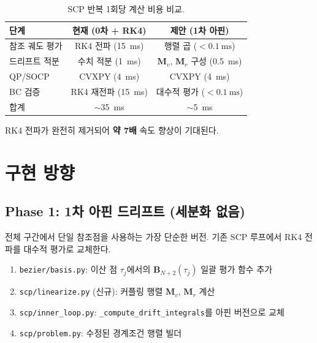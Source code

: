 \documentclass[11pt]{article}
\begin{document}
\begin{table}[h]
\centering
\caption{SCP 반복 1회당 계산 비용 비교.}
\label{tab:cost-compare}
\small
\begin{tabular}{@{}lcc@{}}
\toprule
단계 & 현재 (0차 + RK4) & 제안 (1차 아핀) \\
\midrule
참조 궤도 평가 & RK4 전파 (\SI{15}{\ms}) & 행렬 곱 ($<\SI{0.1}{\ms}$) \\
드리프트 적분   & 수치 적분 (\SI{1}{\ms}) & $\mathbf{M}_v$, $\mathbf{M}_r$ 구성 (\SI{0.5}{\ms}) \\
QP/SOCP        & CVXPY (\SI{4}{\ms})      & CVXPY (\SI{4}{\ms}) \\
BC 검증        & RK4 재전파 (\SI{15}{\ms}) & 대수적 평가 ($<\SI{0.1}{\ms}$) \\
\midrule
합계           & $\sim$\SI{35}{\ms}       & $\sim$\SI{5}{\ms} \\
\bottomrule
\end{tabular}
\end{table}

RK4 전파가 완전히 제거되어 \textbf{약 7배} 속도 향상이 기대된다.

\section{구현 방향}
\label{sec:implementation}

\subsection{Phase 1: 1차 아핀 드리프트 (세분화 없음)}

전체 구간에서 단일 참조점을 사용하는 가장 단순한 버전.
기존 SCP 루프에서 RK4 전파를 대수적 평가로 교체한다.

\begin{enumerate}
  \item \texttt{bezier/basis.py}: 이산 점 $\tau_j$에서의 $\mathbf{B}_{N+2}(\tau_j)$ 일괄 평가 함수 추가
  \item \texttt{scp/linearize.py} (신규): 커플링 행렬 $\mathbf{M}_v$, $\mathbf{M}_r$ 계산
  \item \texttt{scp/inner\_loop.py}: \texttt{\_compute\_drift\_integrals}를 아핀 버전으로 교체
  \item \texttt{scp/problem.py}: 수정된 경계조건 행렬 빌더
\end{enumerate}
\end{document}
